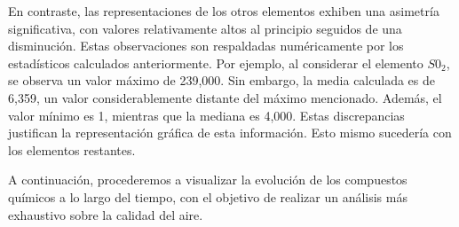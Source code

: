 \documentclass[notspecified,article,submit,moreauthors,pdftex]{Definitions/mdpi}
\begin{document}
En contraste, las representaciones de los otros elementos exhiben una
asimetría significativa, con valores relativamente altos al principio
seguidos de una disminución. Estas observaciones son respaldadas
numéricamente por los estadísticos calculados anteriormente. Por
ejemplo, al considerar el elemento \(S0_{2}\), se observa un valor
máximo de 239,000. Sin embargo, la media calculada es de 6,359, un valor
considerablemente distante del máximo mencionado. Además, el valor
mínimo es 1, mientras que la mediana es 4,000. Estas discrepancias
justifican la representación gráfica de esta información. Esto mismo
sucedería con los elementos restantes.

A continuación, procederemos a visualizar la evolución de los compuestos
químicos a lo largo del tiempo, con el objetivo de realizar un análisis
más exhaustivo sobre la calidad del aire.
\end{document}
